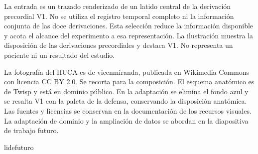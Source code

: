 {\begin{frame}[c]
{La entrada es un trazado renderizado de un latido central de la derivación precordial V1. No se utiliza el registro temporal completo ni la información conjunta de las doce derivaciones. Esta selección reduce la información disponible y acota el alcance del experimento a esa representación. La ilustración muestra la disposición de las derivaciones precordiales y destaca V1. No representa un paciente ni un resultado del estudio.

La fotografía del HUCA es de vicenmiranda, publicada en Wikimedia Commons con licencia CC BY 2.0. Se recorta para la composición. El esquema anatómico es de Twisp y está en dominio público. En la adaptación se elimina el fondo azul y se resalta V1 con la paleta de la defensa, conservando la disposición anatómica. Las fuentes y licencias se conservan en la documentación de los recursos visuales. La adaptación de dominio y la ampliación de datos se abordan en la diapositiva de trabajo futuro.}
\end{frame}}

\expandafter\newcommand\csname Slidefuturo

